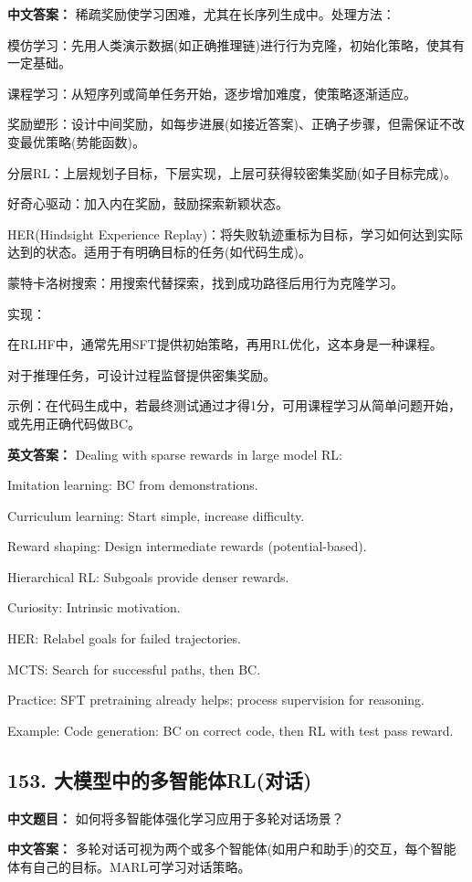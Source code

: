 \documentclass[10pt,a4paper]{ctexart}
\begin{document}
\textbf{中文答案：}
稀疏奖励使学习困难，尤其在长序列生成中。处理方法：

模仿学习：先用人类演示数据(如正确推理链)进行行为克隆，初始化策略，使其有一定基础。

课程学习：从短序列或简单任务开始，逐步增加难度，使策略逐渐适应。

奖励塑形：设计中间奖励，如每步进展(如接近答案)、正确子步骤，但需保证不改变最优策略(势能函数)。

分层RL：上层规划子目标，下层实现，上层可获得较密集奖励(如子目标完成)。

好奇心驱动：加入内在奖励，鼓励探索新颖状态。

HER(Hindsight Experience Replay)：将失败轨迹重标为目标，学习如何达到实际达到的状态。适用于有明确目标的任务(如代码生成)。

蒙特卡洛树搜索：用搜索代替探索，找到成功路径后用行为克隆学习。

实现：

在RLHF中，通常先用SFT提供初始策略，再用RL优化，这本身是一种课程。

对于推理任务，可设计过程监督提供密集奖励。

示例：在代码生成中，若最终测试通过才得1分，可用课程学习从简单问题开始，或先用正确代码做BC。

\textbf{英文答案：}
Dealing with sparse rewards in large model RL:

Imitation learning: BC from demonstrations.

Curriculum learning: Start simple, increase difficulty.

Reward shaping: Design intermediate rewards (potential-based).

Hierarchical RL: Subgoals provide denser rewards.

Curiosity: Intrinsic motivation.

HER: Relabel goals for failed trajectories.

MCTS: Search for successful paths, then BC.

Practice: SFT pretraining already helps; process supervision for reasoning.

Example: Code generation: BC on correct code, then RL with test pass reward.

\subsection*{153. 大模型中的多智能体RL(对话)}
\textbf{中文题目：} 如何将多智能体强化学习应用于多轮对话场景？

\textbf{中文答案：}
多轮对话可视为两个或多个智能体(如用户和助手)的交互，每个智能体有自己的目标。MARL可学习对话策略。
\end{document}
